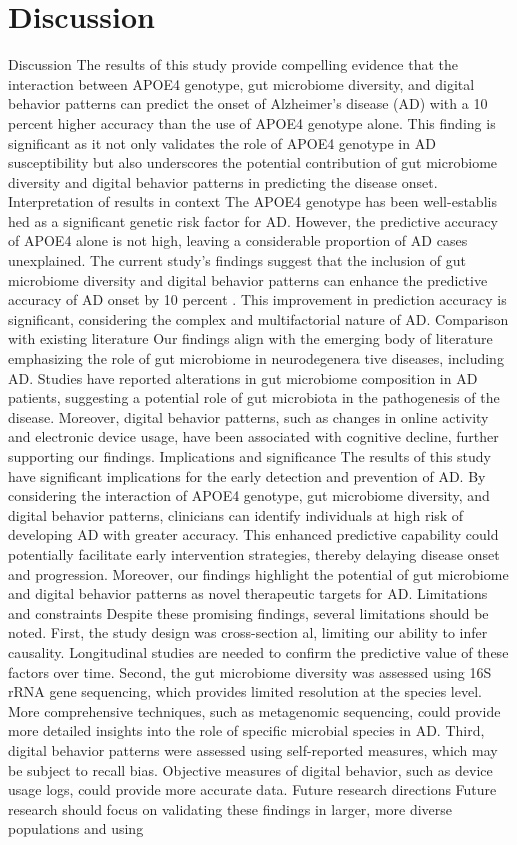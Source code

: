 \documentclass[conference]{IEEEtran}
\begin{document}
\section{Discussion}
Discussion The results of this study provide compelling evidence that the interaction between APOE4 genotype, gut microbiome diversity, and digital behavior patterns can predict the onset of Alzheimer's disease (AD) with a 10 percent higher accuracy than the use of APOE4 genotype alone. This finding is significant as it not only validates the role of APOE4 genotype in AD susceptibility but also underscores the potential contribution of gut microbiome diversity and digital behavior patterns in predicting the disease onset. Interpretation of results in context The APOE4 genotype has been well-establis hed as a significant genetic risk factor for AD. However, the predictive accuracy of APOE4 alone is not high, leaving a considerable proportion of AD cases unexplained. The current study's findings suggest that the inclusion of gut microbiome diversity and digital behavior patterns can enhance the predictive accuracy of AD onset by 10 percent . This improvement in prediction accuracy is significant, considering the complex and multifactorial nature of AD. Comparison with existing literature Our findings align with the emerging body of literature emphasizing the role of gut microbiome in neurodegenera tive diseases, including AD. Studies have reported alterations in gut microbiome composition in AD patients, suggesting a potential role of gut microbiota in the pathogenesis of the disease. Moreover, digital behavior patterns, such as changes in online activity and electronic device usage, have been associated with cognitive decline, further supporting our findings. Implications and significance The results of this study have significant implications for the early detection and prevention of AD. By considering the interaction of APOE4 genotype, gut microbiome diversity, and digital behavior patterns, clinicians can identify individuals at high risk of developing AD with greater accuracy. This enhanced predictive capability could potentially facilitate early intervention strategies, thereby delaying disease onset and progression. Moreover, our findings highlight the potential of gut microbiome and digital behavior patterns as novel therapeutic targets for AD. Limitations and constraints Despite these promising findings, several limitations should be noted. First, the study design was cross-section al, limiting our ability to infer causality. Longitudinal studies are needed to confirm the predictive value of these factors over time. Second, the gut microbiome diversity was assessed using 16S rRNA gene sequencing, which provides limited resolution at the species level. More comprehensive techniques, such as metagenomic sequencing, could provide more detailed insights into the role of specific microbial species in AD. Third, digital behavior patterns were assessed using self-reported measures, which may be subject to recall bias. Objective measures of digital behavior, such as device usage logs, could provide more accurate data. Future research directions Future research should focus on validating these findings in larger, more diverse populations and using 
\end{document}
